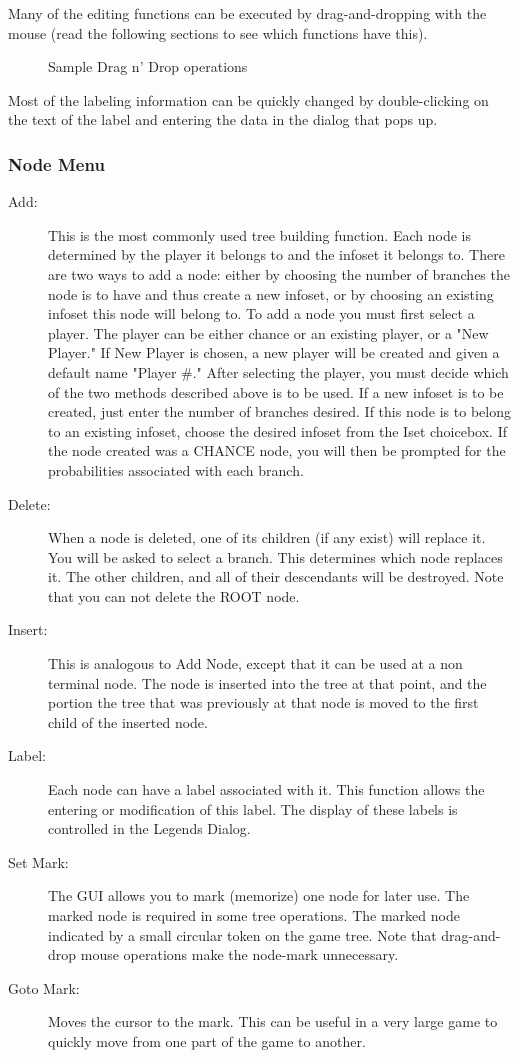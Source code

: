 Many of the editing functions can be executed
by drag-and-dropping with the mouse (read the following sections to see
which functions have this).
\begin{figure}
\caption{Sample Drag n' Drop operations}
\end{figure}

Most of the labeling information can be
quickly changed by double-clicking on the text of the label and entering
the data in the dialog that pops up.

\subsubsection{Node Menu}
\begin{description}
\item[Add:] This is the most commonly used tree building
function.  Each node is determined by the player it belongs to and the
infoset it belongs to.  There are two ways to add a node: either by
choosing the number of branches the node is to have and thus create a new
infoset, or by choosing an existing infoset this node will belong to.  To
add a node you must first select a player.  The player can be either
chance or an existing player, or a "New Player."  If New Player is chosen,
a new player will be created and given a default name "Player \#." After
selecting the player, you must decide which of the two methods described
above is to be used.  If a new infoset is to be created, just enter the
number of branches desired.  If this node is to belong to an existing
infoset, choose the desired infoset from the Iset choicebox.  If the node
created was a CHANCE node, you will then be prompted for the probabilities
associated with each branch.
\item[Delete:]  When a node is deleted, one of its children (if any
exist) will replace it.  You will be asked to select a branch.  This determines which 
node replaces it.  The other children, and all of their descendants will be destroyed.  
Note that you can not delete the ROOT node.
\item[Insert:] This is analogous to Add Node, except that it can be used at a 
non terminal node.  The node is inserted into the tree at that point, and the portion 
the tree that was previously at that node is moved to the first child 
of the inserted node. 
\item[Label:]  Each node can have a label associated with it. 
This function allows the entering or modification of this label.  The
display of these labels is controlled in the Legends Dialog.
\item[Set Mark:]  The GUI allows you to mark (memorize) one
node for later use.  The marked node is required in some tree operations. 
The marked node indicated by a small circular token 
on the game tree.  Note that drag-and-drop mouse operations make the
node-mark unnecessary.
\item[Goto Mark:]  Moves the cursor to the mark.  This can be useful in a 
very large game to quickly move from one part of the game to another. 
\end{description}

